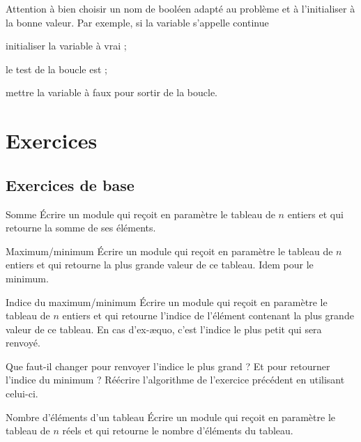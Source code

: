 	Attention à bien choisir un nom de booléen adapté au problème
	et à l'initialiser à la bonne valeur. 
	Par exemple, si la variable s'appelle \og{}continue\fg{}
	\begin{liste}
	\item initialiser la variable à vrai ;
	\item le test de la boucle est \og{}\fg{} ;
	\item mettre la variable à faux pour sortir de la boucle.
	\end{liste}

\section{Exercices}

\subsection{Exercices de base}

\begin{Exercice}{Somme}
	Écrire un module qui reçoit en paramètre le tableau
	 de $n$ entiers 
	et qui retourne la somme de ses éléments.
\end{Exercice}

\begin{Exercice}{Maximum/minimum}
	Écrire un module qui reçoit en paramètre le tableau
	 de $n$ entiers et qui
	retourne la plus grande valeur de ce tableau. Idem pour le minimum.
\end{Exercice}

\begin{Exercice}{Indice du maximum/minimum}
	\label{ex:indiceminmax}
	Écrire un module qui reçoit en paramètre le tableau
	 de $n$ entiers et qui
	retourne l’indice de l’élément contenant la plus grande valeur de ce
	tableau. 
	En cas d’ex-æquo, c’est l’indice le plus petit qui sera renvoyé.
	
	Que faut-il changer pour renvoyer l’indice le plus grand ?
	Et pour retourner l’indice du minimum ? 
	Réécrire l’algorithme de l’exercice précédent en utilisant celui-ci.
\end{Exercice}

\begin{Exercice}{Nombre d'éléments d'un tableau}
	Écrire un module qui reçoit en paramètre le tableau
	 de $n$ réels et qui
	retourne le nombre d’éléments du tableau.
\end{Exercice}


